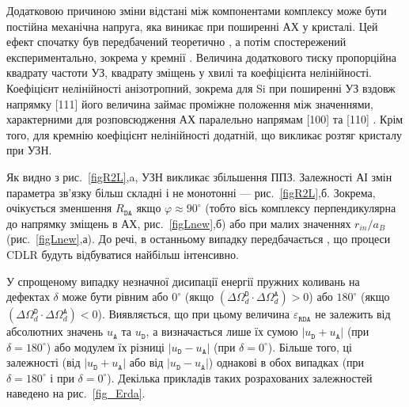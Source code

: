 Додатковою причиною зміни відстані між компонентами комплексу може бути постійна механічна напруга,
яка виникає при поширенні АХ у кристалі.
Цей ефект спочатку був передбачений теоретично \cite{Thurston,StaticStrain:PhysRevB30I}, а потім
спостережений експериментально, зокрема у кремнії \cite{StaticStrain:PhysRevB30II}.
Величина додаткового тиску пропорційна квадрату частоти УЗ, квадрату зміщень у хвилі та коефіцієнта нелінійності\cite{StaticStrain:PhysRevB30II}.
Коефіцієнт нелінійності анізотропний, зокрема для Si при
поширенні УЗ вздовж напрямку [111] його величина займає проміжне положення між значеннями, характерними для розповсюдження АХ
паралельно напрямам [100] та [110] \cite{NelinSi}.
Крім того, для кремнію коефіцієнт нелінійності додатній, що викликає розтяг кристалу при УЗН.




Як видно з рис.~\ref{figR2L},a, УЗН викликає збільшення ППЗ.
Залежності АІ змін параметра зв'язку більш складні і не монотонні --- рис.~\ref{figR2L},б.
Зокрема, очікується  зменшення $R_{\mathtt{DA}}$ якщо $\varphi\approx90^\circ$ (тобто вісь комплексу перпендикулярна до напрямку зміщень в АХ, рис.~\ref{figLnew},б)
або при малих значеннях $r_{in}/a_B$ (рис.~\ref{figLnew},а).
До речі, в останньому випадку передбачається \cite{CDLR:JAP1995,CDLR:JAP}, що процеси CDLR будуть відбуватися найбільш інтенсивно.

У спрощеному випадку незначної дисипації енергії пружних коливань на дефектах
$\delta$ може бути рівним або $0^\circ$ (якщо $(\Delta\Omega_d^\mathtt{D}\cdot\Delta\Omega_d^\mathtt{A})>0$)
або $180^\circ$ (якщо $(\Delta\Omega_d^\mathtt{D}\cdot\Delta\Omega_d^\mathtt{A})<0$).
Виявляється, що при цьому величина $\varepsilon_{\mathtt{RDA}}$ не залежить від абсолютних значень $u_\mathtt{A}$ та $u_\mathtt{D}$,
а визначається лише їх сумою $|u_\mathtt{D}+u_\mathtt{A}|$ (при $\delta=180^\circ$)
або модулем їх різниці $|u_\mathtt{D}-u_\mathtt{A}|$ (при $\delta=0^\circ$).
Більше того, ці залежності (від $|u_\mathtt{D}+u_\mathtt{A}|$ або від $|u_\mathtt{D}-u_\mathtt{A}|$) однакові в обох випадках
(при $\delta=180^\circ$ і при $\delta=0^\circ$).
Декілька прикладів таких розрахованих залежностей наведено на рис.~\ref{fig_Erda}.

